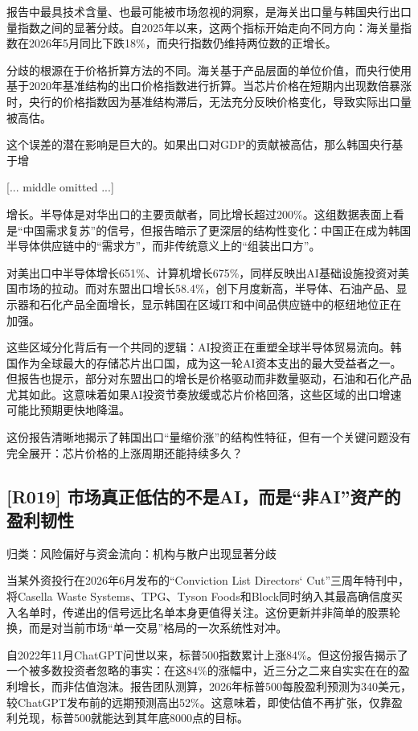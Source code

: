 \documentclass[11pt]{ctexart}
\begin{document}
报告中最具技术含量、也最可能被市场忽视的洞察，是海关出口量与韩国央行出口量指数之间的显著分歧。自2025年以来，这两个指标开始走向不同方向：海关量指数在2026年5月同比下跌18\%，而央行指数仍维持两位数的正增长。

分歧的根源在于价格折算方法的不同。海关基于产品层面的单位价值，而央行使用基于2020年基准结构的出口价格指数进行折算。当芯片价格在短期内出现数倍暴涨时，央行的价格指数因为基准结构滞后，无法充分反映价格变化，导致实际出口量被高估。

这个误差的潜在影响是巨大的。如果出口对GDP的贡献被高估，那么韩国央行基于增

[... middle omitted ...]

增长。半导体是对华出口的主要贡献者，同比增长超过200\%。这组数据表面上看是“中国需求复苏”的信号，但报告暗示了更深层的结构性变化：中国正在成为韩国半导体供应链中的“需求方”，而非传统意义上的“组装出口方”。

对美出口中半导体增长651\%、计算机增长675\%，同样反映出AI基础设施投资对美国市场的拉动。而对东盟出口增长58.4\%，创下月度新高，半导体、石油产品、显示器和石化产品全面增长，显示韩国在区域IT和中间品供应链中的枢纽地位正在加强。

这些区域分化背后有一个共同的逻辑：AI投资正在重塑全球半导体贸易流向。韩国作为全球最大的存储芯片出口国，成为这一轮AI资本支出的最大受益者之一。但报告也提示，部分对东盟出口的增长是价格驱动而非数量驱动，石油和石化产品尤其如此。这意味着如果AI投资节奏放缓或芯片价格回落，这些区域的出口增速可能比预期更快地降温。

这份报告清晰地揭示了韩国出口“量缩价涨”的结构性特征，但有一个关键问题没有完全展开：芯片价格的上涨周期还能持续多久？

\subsection{[R019] 市场真正低估的不是AI，而是“非AI”资产的盈利韧性}
{\small\color{refgray}归类：风险偏好与资金流向：机构与散户出现显著分歧}

当某外资投行在2026年6月发布的“Conviction List Directors‘ Cut”三周年特刊中，将Casella Waste Systems、TPG、Tyson Foods和Block同时纳入其最高确信度买入名单时，传递出的信号远比名单本身更值得关注。这份更新并非简单的股票轮换，而是对当前市场“单一交易”格局的一次系统性对冲。

自2022年11月ChatGPT问世以来，标普500指数累计上涨84\%。但这份报告揭示了一个被多数投资者忽略的事实：在这84\%的涨幅中，近三分之二来自实实在在的盈利增长，而非估值泡沫。报告团队测算，2026年标普500每股盈利预测为340美元，较ChatGPT发布前的远期预测高出52\%。这意味着，即使估值不再扩张，仅靠盈利兑现，标普500就能达到其年底8000点的目标。
\end{document}

